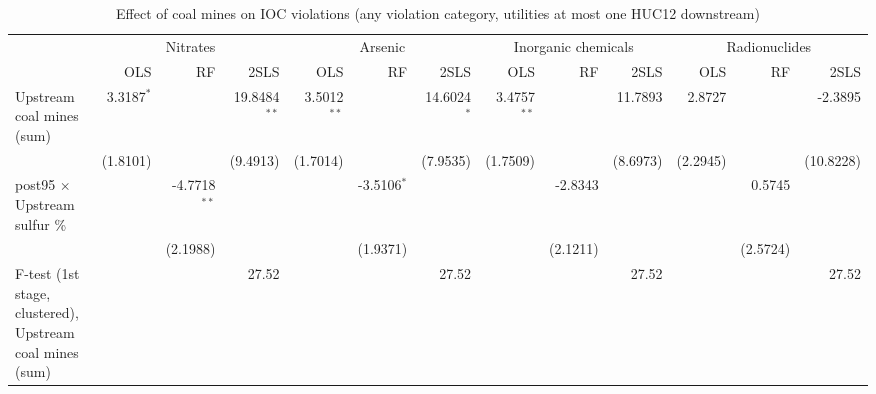 
\begin{table}[htbp]
   
   \caption{\label{2sls_dwnstrm_minevio_allcat_ivsum} Effect of coal mines on IOC violations (any violation category, utilities at most one HUC12 downstream)}
   \bigskip
   
   \centering
   
   \begin{adjustbox}{width = \textwidth, center}
      
      
      \begin{tabular}{lrrrrrrrrrrrr}
         \toprule
         
          & \multicolumn{3}{c}{Nitrates} & \multicolumn{3}{c}{Arsenic} & \multicolumn{3}{c}{Inorganic chemicals} & \multicolumn{3}{c}{Radionuclides}\\
         
                                                                  & OLS          & RF             & 2SLS           & OLS           & RF            & 2SLS          & OLS           & RF       & 2SLS     & OLS      & RF       & 2SLS\\  
         
         \midrule 
         Upstream coal mines (sum)                                & 3.3187$^{*}$ &                & 19.8484$^{**}$ & 3.5012$^{**}$ &               & 14.6024$^{*}$ & 3.4757$^{**}$ &          & 11.7893  & 2.8727   &          & -2.3895\\   
                                                                  & (1.8101)     &                & (9.4913)       & (1.7014)      &               & (7.9535)      & (1.7509)      &          & (8.6973) & (2.2945) &          & (10.8228)\\   
         post95 $\times$ Upstream sulfur \%                       &              & -4.7718$^{**}$ &                &               & -3.5106$^{*}$ &               &               & -2.8343  &          &          & 0.5745   &   \\   
                                                                  &              & (2.1988)       &                &               & (1.9371)      &               &               & (2.1211) &          &          & (2.5724) &   \\   
         
         F-test (1st stage, clustered), Upstream coal mines (sum) &              &                & 27.52          &               &               & 27.52         &               &          & 27.52    &          &          & 27.52\\  
         

\end{tabular}
\end{adjustbox}
\end{table}
